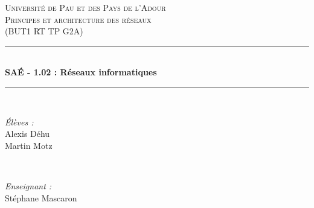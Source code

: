 \documentclass[a4paper]{article}
\newcommand{\HRule}{\rule{\linewidth}{0.5mm}}
\begin{document}
\begin{titlepage}


\center %
 

\textsc{\LARGE Université de Pau et des Pays de l’Adour}\\[1.3cm] %

\textsc{\Large Principes et architecture des réseaux }\\[0.6cm] %
\textsc{\large (BUT1 RT TP G2A)}\\[0.6cm] %

\HRule \\[0.4cm]
{ \huge \bfseries SAÉ - 1.02 : Réseaux informatiques}\\[0.4cm] %

\HRule \\[1.5cm]


\begin{minipage}{0.4\textwidth}
\begin{flushleft} \large
\emph{Élèves :}\\[.5cm]
Alexis Déhu 
\\[.5cm]
Martin Motz\\[.5cm]

\end{flushleft}
\end{minipage}
~
\begin{minipage}{0.4\textwidth}
\begin{flushright} \large
\emph{Enseignant :} \\
Stéphane Mascaron \end{flushright}
\end{minipage}\\[3cm]

\end{titlepage}
\end{document}
